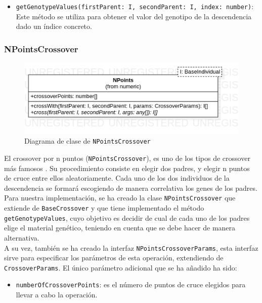 \begin{itemize}
    \item \texttt{getGenotypeValues(firstParent: I, secondParent: I, index: number)}: Este método se utiliza para obtener el valor del genotipo de la descendencia dado un índice concreto.
\end{itemize}

\subsubsection{NPointsCrossover}

\begin{figure}[ht]
    \centering
    \includegraphics[scale=0.5]{mem/images/cap-4/4.2.6(Crossover)/NPoints.png}
    \caption{Diagrama de clase de \texttt{NPointsCrossover}}
    \label{fig:my_label}
\end{figure}

El crossover por n puntos (\texttt{NPointsCrossover}), es uno de los tipos de crossover más famosos \cite{spears1991analysis}. Su procedimiento consiste en elegir dos padres, y elegir n puntos de cruce entre ellos aleatoriamente. Cada uno de los dos individuos de la descendencia se formará escogiendo de manera correlativa los genes de los padres. \\

Para nuestra implementación, se ha creado la clase \texttt{NPointsCrossover} que extiende de \texttt{BaseCrossover} y que tiene implementado el método \texttt{getGenotypeValues}, cuyo objetivo es decidir de cual de cada uno de los padres elige el material genético, teniendo en cuenta que se debe hacer de manera alternativa. \\

A su vez, también se ha creado la interfaz \texttt{NPointsCrossoverParams}, esta interfaz sirve para especificar los parámetros de esta operación, extendiendo de \texttt{CrossoverParams}. El único parámetro adicional que se ha añadido ha sido:

\begin{itemize}
    \item \texttt{numberOfCrossoverPoints}: es el número de puntos de cruce elegidos para llevar a cabo la operación.
\end{itemize}

